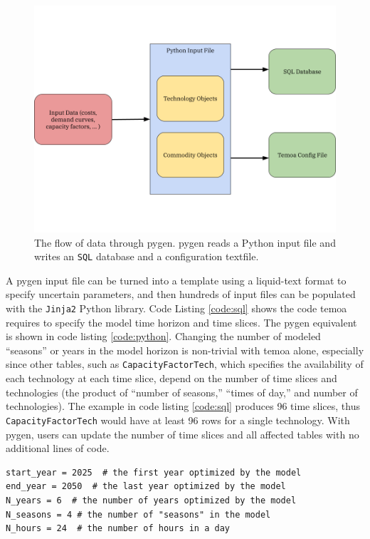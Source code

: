 \begin{figure}[H]
  \centering
  \includegraphics[width=0.8\columnwidth]{figures/pygen-outline.png}
  \caption{The flow of data through \gls{pygen}. \gls{pygen} reads a Python
  input file and writes an \texttt{SQL} database and a configuration textfile.}
  \label{fig:pygen-flow}
\end{figure}

A \gls{pygen} input file can be turned into a template using a liquid-text format
to specify uncertain parameters, and then hundreds of input files can be
populated with the \texttt{Jinja2} Python library. Code Listing \ref{code:sql} shows
the code \gls{temoa} requires to specify the model time horizon and time slices.
The \gls{pygen} equivalent is shown in code listing \ref{code:python}. Changing
the number of modeled ``seasons'' or years in the model horizon is non-trivial with
\gls{temoa} alone, especially since other tables, such as \texttt{CapacityFactorTech},
which specifies the availability of each technology at each time slice, depend
on the number of time slices and technologies (the product of ``number of seasons,''
``times of day,'' and number of technologies).
The example in code listing \ref{code:sql} produces 96 time slices, thus \texttt{CapacityFactorTech}
would have at least 96 rows for a single technology. With \gls{pygen}, users can
update the number of time slices and all affected tables with no additional lines
of code.



\begin{lstlisting}[style=pythonstyle, caption={Equivalent \gls{pygen} code to specify the model horizon and time slices.}, label={code:python}, floatplacement=H]
start_year = 2025  # the first year optimized by the model
end_year = 2050  # the last year optimized by the model
N_years = 6  # the number of years optimized by the model
N_seasons = 4 # the number of "seasons" in the model
N_hours = 24  # the number of hours in a day
\end{lstlisting}




